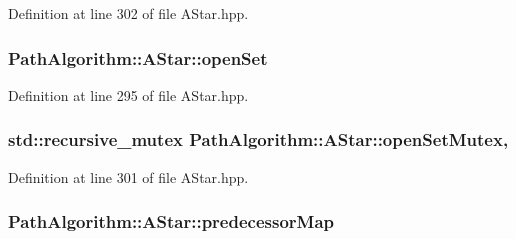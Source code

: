 Definition at line 302 of file A\+Star.\+hpp.

\subsubsection[{\texorpdfstring{open\+Set}{openSet}}]{ Path\+Algorithm\+::\+A\+Star\+::open\+Set\hspace{0.3cm}{\ttfamily [private]}}\hypertarget{class_path_algorithm_1_1_a_star_a51ac9d9ef516c2317c2c77a919b64532}{}\label{class_path_algorithm_1_1_a_star_a51ac9d9ef516c2317c2c77a919b64532}


Definition at line 295 of file A\+Star.\+hpp.

\subsubsection[{\texorpdfstring{open\+Set\+Mutex}{openSetMutex}}]{\setlength{\rightskip}{0pt plus 5cm}std\+::recursive\+\_\+mutex Path\+Algorithm\+::\+A\+Star\+::open\+Set\+Mutex\hspace{0.3cm}{\ttfamily [mutable]}, {\ttfamily [private]}}\hypertarget{class_path_algorithm_1_1_a_star_a2352488a734c820b77410b1ed7914a49}{}\label{class_path_algorithm_1_1_a_star_a2352488a734c820b77410b1ed7914a49}


Definition at line 301 of file A\+Star.\+hpp.

\subsubsection[{\texorpdfstring{predecessor\+Map}{predecessorMap}}]{ Path\+Algorithm\+::\+A\+Star\+::predecessor\+Map\hspace{0.3cm}{\ttfamily [private]}}\hypertarget{class_path_algorithm_1_1_a_star_a0fb8d0d9ad9822987926c815c9d4353d}{}\label{class_path_algorithm_1_1_a_star_a0fb8d0d9ad9822987926c815c9d4353d}


